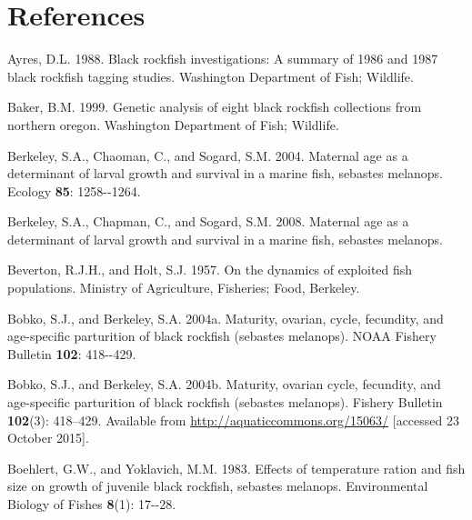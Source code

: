 \documentclass[11pt,
  letterpaper,
]{article}
\newlength{\cslhangindent}
\newenvironment{CSLReferences}[2] %
 {%
  \setlength{\parindent}{0pt}
  \ifodd #1 \everypar{\setlength{\hangindent}{\cslhangindent}}\ignorespaces\fi
  \ifnum #2 > 0
  \setlength{\parskip}{#2\baselineskip}
  \fi
 }%
 {}
\begin{document}
\clearpage

\hypertarget{references}{%
\section{References}\label{references}}

\hypertarget{refs}{}
\begin{CSLReferences}{1}{0}
\leavevmode{}%
Ayres, D.L. 1988. Black rockfish investigations: A summary of 1986 and 1987 black rockfish tagging studies. Washington Department of Fish; Wildlife.

\leavevmode{}%
Baker, B.M. 1999. Genetic analysis of eight black rockfish collections from northern oregon. Washington Department of Fish; Wildlife.

\leavevmode{}%
Berkeley, S.A., Chaoman, C., and Sogard, S.M. 2004. Maternal age as a determinant of larval growth and survival in a marine fish, sebastes melanops. Ecology \textbf{85}: 1258-\/-1264.

\leavevmode{}%
Berkeley, S.A., Chapman, C., and Sogard, S.M. 2008. Maternal age as a determinant of larval growth and survival in a marine fish, sebastes melanops.

\leavevmode{}%
Beverton, R.J.H., and Holt, S.J. 1957. On the dynamics of exploited fish populations. Ministry of Agriculture, Fisheries; Food, Berkeley.

\leavevmode{}%
Bobko, S.J., and Berkeley, S.A. 2004a. Maturity, ovarian, cycle, fecundity, and age-specific parturition of black rockfish (sebastes melanops). NOAA Fishery Bulletin \textbf{102}: 418-\/-429.

\leavevmode{}%
Bobko, S.J., and Berkeley, S.A. 2004b. Maturity, ovarian cycle, fecundity, and age-specific parturition of black rockfish (sebastes melanops). Fishery Bulletin \textbf{102}(3): 418--429. Available from \url{http://aquaticcommons.org/15063/} {[}accessed 23 October 2015{]}.

\leavevmode{}%
Boehlert, G.W., and Yoklavich, M.M. 1983. Effects of temperature ration and fish size on growth of juvenile black rockfish, sebastes melanops. Environmental Biology of Fishes \textbf{8}(1): 17-\/-28.


\end{CSLReferences}
\end{document}
